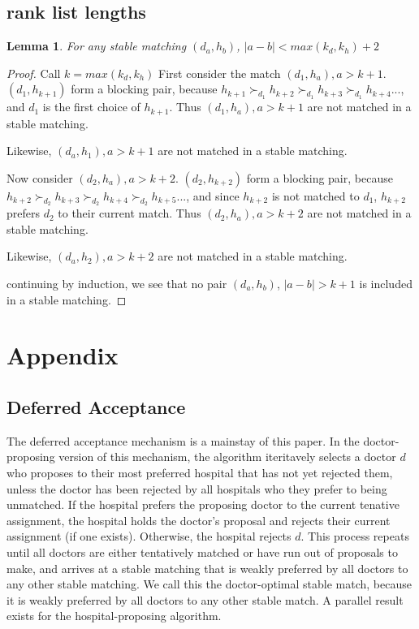 \documentclass[WP]{AEA}
\newtheorem{lemma}{Lemma}
\begin{document}
\subsection{rank list lengths}
\begin{lemma}
	For any stable matching $(d_a,h_b)$, $|a-b| < max(k_d,k_h)+2$
\end{lemma}
\begin{proof}
	Call $k = max(k_d,k_h)$
	First consider the match $(d_1,h_a), a > k+1$.  $(d_1,h_{k+1})$ form a blocking pair, because $h_{k+1} \succ_{d_1} h_{k+2} \succ_{d_1} h_{k+3} \succ_{d_1} h_{k+4}...$, and $d_1$ is the first choice of $h_{k+1}$.  Thus $(d_1,h_a), a > k+1$ are not matched in a stable matching.
	
	Likewise, $(d_a,h_1), a > k+1$ are not matched in a stable matching.

	Now consider $(d_2,h_a), a > k+2$.  $(d_2,h_{k+2})$ form a blocking pair, because $h_{k+2} \succ_{d_2} h_{k+3} \succ_{d_2} h_{k+4} \succ_{d_2} h_{k+5}...$, and since $h_{k+2}$ is not matched to $d_1$,  $h_{k+2}$ prefers $d_2$ to their current match.  Thus $(d_2,h_a), a > k+2$ are not matched in a stable matching.

	Likewise, $(d_a,h_2), a > k+2$ are not matched in a stable matching.

	continuing by induction, we see that no pair $(d_a,h_b)$, $|a-b| > k+1$ is included in a stable matching.


\end{proof}

	







\appendix



\section{ Appendix}

\subsection{Deferred Acceptance}
The deferred acceptance mechanism is a mainstay of this paper. In the doctor-proposing version of this mechanism, the algorithm iteritavely selects a doctor $d$ who proposes to their most preferred hospital that has not yet rejected them, unless the doctor has been rejected by all hospitals who they prefer to being unmatched.  If the hospital prefers the proposing doctor to the current tenative assignment, the hospital holds the doctor's proposal and rejects their current assignment (if one exists). Otherwise, the hospital rejects $d$.  This process repeats until all doctors are either tentatively matched or have run out of proposals to make, and arrives at a stable matching that is weakly preferred by all doctors to any other stable matching.  We call this the doctor-optimal stable match, because it is weakly preferred by all doctors to any other stable match.  A parallel result exists for the hospital-proposing algorithm.
\end{document}
